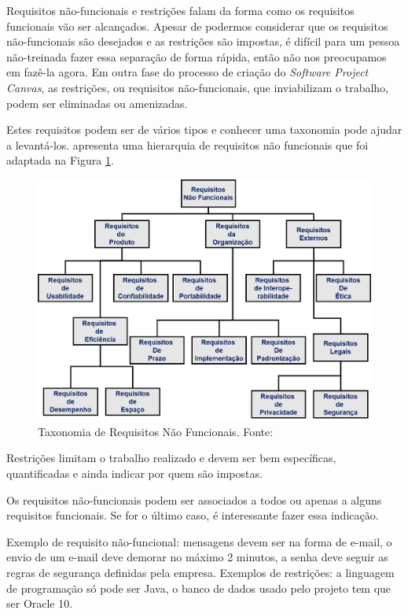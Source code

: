 \documentclass[fontsize=12pt, a4paper,pagesize=auto,toc=listof, ,twoside,chapterprefix=false,appendixprefix=true,open=right]{scrbook}
\newcommand{\othersize}{0.7\linewidth}
\begin{document}
Requisitos não-funcionais e restrições falam da forma como os requisitos funcionais vão ser alcançados.
Apesar de podermos considerar que os requisitos não-funcionais são desejados e as restrições são impostas, é difícil para um pessoa não-treinada fazer essa separação de forma rápida, então não nos preocupamos em fazê-la agora.
Em outra fase do processo de criação do \textit{Software Project Canvas}, as restrições, ou requisitos não-funcionais, que inviabilizam o trabalho, podem ser eliminadas ou amenizadas.


Estes requisitos podem ser de vários tipos e conhecer uma taxonomia pode ajudar a levantá-los. \citet{sommerville:software:2015} apresenta uma hierarquia de requisitos não funcionais que foi adaptada na Figura \ref{fig:nofunreq}.

\begin{figure}
    \centering
    \includegraphics[width=\othersize]{imagens/NonFunReq.png}
    \caption{Taxonomia de Requisitos Não Funcionais. Fonte: \citet{sommerville:software:2015}}
    \label{fig:nofunreq}
\end{figure}

Restrições limitam o trabalho realizado e devem ser bem específicas, quantificadas e ainda indicar por quem são impostas.

Os requisitos não-funcionais podem ser associados a todos ou apenas a alguns requisitos funcionais.
Se for o último caso, é interessante fazer essa indicação.

Exemplo de requisito não-funcional: mensagens devem ser na forma de e-mail, o envio de um e-mail deve demorar no máximo 2 minutos, a senha deve seguir as regras de segurança definidas pela empresa.
Exemplos de restrições: a linguagem de programação só pode ser Java, o banco de dados usado pelo projeto tem que ser Oracle 10.
\end{document}
